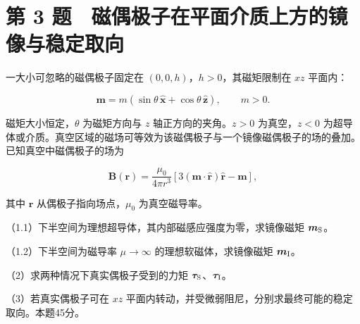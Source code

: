 \documentclass[12pt,a4paper,fontset=fandol]{ctexart}
\begin{document}
\clearpage

\section{第 3
题　磁偶极子在平面介质上方的镜像与稳定取向}\label{ux7b2c-3-ux9898-ux78c1ux5076ux6781ux5b50ux5728ux5e73ux9762ux4ecbux8d28ux4e0aux65b9ux7684ux955cux50cfux4e0eux7a33ux5b9aux53d6ux5411}

一大小可忽略的磁偶极子固定在 \((0,0,h)\)，\(h>0\)，其磁矩限制在 \(xz\)
平面内：

\[
\boldsymbol m=m(\sin\theta\,\hat{\boldsymbol x}+\cos\theta\,\hat{\boldsymbol z}),
\qquad m>0.
\]

磁矩大小恒定，\(\theta\) 为磁矩方向与 \(z\) 轴正方向的夹角。\(z>0\)
为真空，\(z<0\)
为超导体或介质。真空区域的磁场可等效为该磁偶极子与一个镜像磁偶极子的场的叠加。已知真空中磁偶极子的场为

\[
\boldsymbol B(\boldsymbol r)=\frac{\mu_0}{4\pi r^3}
\left[3(\boldsymbol m\cdot\hat{\boldsymbol r})\hat{\boldsymbol r}
-\boldsymbol m\right],
\]

其中 \(\boldsymbol r\) 从偶极子指向场点，\(\mu_0\) 为真空磁导率。

（1.1）下半空间为理想超导体，其内部磁感应强度为零，求镜像磁矩
\(\boldsymbol m_{\rm S}\)。

（1.2）下半空间为磁导率 \(\mu\to\infty\) 的理想软磁体，求镜像磁矩
\(\boldsymbol m_{\rm I}\)。

（2）求两种情况下真实偶极子受到的力矩
\(\boldsymbol\tau_{\rm S}\)、\(\boldsymbol\tau_{\rm I}\)。

（3）若真实偶极子可在 \(xz\)
平面内转动，并受微弱阻尼，分别求最终可能的稳定取向。本题45分。

\begin{center}
\begin{minipage}{\linewidth}
\centering\begingroup
{}
\ifdim\wd\diagrambox>.88\linewidth
\sbox{\diagrambox}{\resizebox{.88\linewidth}{!}{\usebox{\diagrambox}}}
\fi
\ifdim\ht\diagrambox>.29\textheight
\resizebox{!}{.29\textheight}{\usebox{\diagrambox}}
\else\usebox{\diagrambox}\fi
\par{}
\endgroup\end{minipage}
\end{center}
\end{document}
